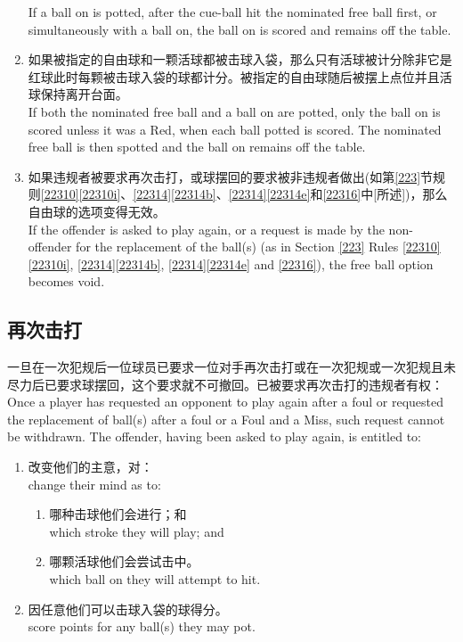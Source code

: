 \begin{enumerate}[label=(\alph*)]
    If a ball on is potted, after the cue-ball hit the nominated free ball first, or simultaneously with a ball on, the ball on is scored and remains off the table.
    \item 如果被指定的自由球和一颗活球都被击球入袋，那么只有活球被计分除非它是红球此时每颗被击球入袋的球都计分。被指定的自由球随后被摆上点位并且活球保持离开台面。\\
    If both the nominated free ball and a ball on are potted, only the ball on is scored unless it was a Red, when each ball potted is scored. The nominated free ball is then spotted and the ball on remains off the table.
    \item 如果违规者被要求再次击打，或球摆回的要求被非违规者做出(如第\ref{223}节规则\ref{22310}\ref{22310i}、\ref{22314}\ref{22314b}、\ref{22314}\ref{22314e}和\ref{22316}中[所述])，那么自由球的选项变得无效。\\
    If the offender is asked to play again, or a request is made by the non-offender for the replacement of the ball(s) (as in Section \ref{223} Rules \ref{22310}\ref{22310i}, \ref{22314}\ref{22314b}, \ref{22314}\ref{22314e} and \ref{22316}), the free ball option becomes void.
\end{enumerate}

\subsection{再次击打}

\noindent 一旦在一次犯规后一位球员已要求一位对手再次击打或在一次犯规或一次犯规且未尽力后已要求球摆回，这个要求就不可撤回。已被要求再次击打的违规者有权：\\
Once a player has requested an opponent to play again after a foul or requested the replacement of ball(s) after a foul or a Foul and a Miss, such request cannot be withdrawn. The offender, having been asked to play again, is entitled to:
\begin{enumerate}[label=(\alph*)]
    \item 改变他们的主意，对：\\
    change their mind as to:
    \begin{enumerate}[label=(\roman*)]
        \item 哪种击球他们会进行；和\\
        which stroke they will play; and
        \item 哪颗活球他们会尝试击中。\\
        which ball on they will attempt to hit.
    \end{enumerate}
    \item 因任意他们可以击球入袋的球得分。\\
    score points for any ball(s) they may pot.
\end{enumerate}

